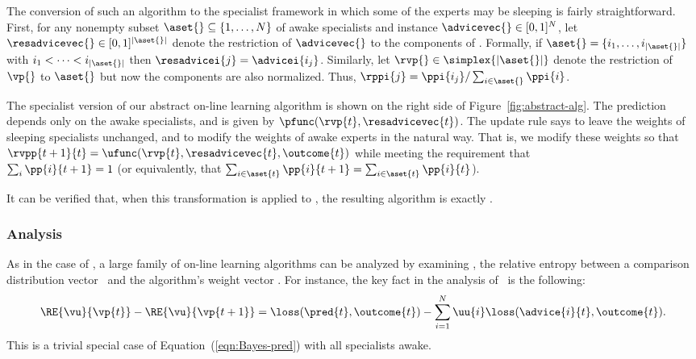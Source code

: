 The conversion of such an algorithm to the specialist framework in
which some of the experts may be sleeping is fairly straightforward.
First, for any nonempty subset 
$\aset{}\subseteq \{1,\ldots,N\}$ of awake
specialists and instance $\advicevec{}\in [0,1]^N$, let
$\resadvicevec{}\in [0,1]^{|\aset{}|}$ denote the restriction of
$\advicevec{}$ to the components of \aset{}.
Formally, if $\aset{} = \{i_1,\ldots,i_{|\aset{}|}\}$ with
$i_1<\cdots<i_{|\aset{}|}$
then
$\resadvicei{j} = \advicei{i_j}$.
Similarly, let $\rvp{}\in \simplex{|\aset{}|}$ denote the restriction of
$\vp{}$ to $\aset{}$ but now the components are also normalized.
Thus, $\rppi{j} = \ppi{i_j} / \sum_{i\in \aset{}} \ppi{i}$.

The specialist version of our abstract on-line learning algorithm is
shown on the right side of Figure~\ref{fig:abstract-alg}.
The prediction depends only on the awake specialists, and is given by
$\pfunc(\rvp{t},\resadvicevec{t})$.
The update rule says to leave the weights of sleeping specialists
unchanged, and to modify the weights of awake experts in the natural
way.
That is, we modify these weights so that
$\rvpp{t+1}{t} = \ufunc(\rvp{t},\resadvicevec{t},\outcome{t})$ while
meeting the requirement that \\
$\sum_i \pp{i}{t+1} = 1$
(or equivalently, that
$\sum_{i\in\aset{t}} \pp{i}{t+1} = 
  \sum_{i\in\aset{t}} \pp{i}{t}$).

It can be verified that, when this transformation is applied to
\Bayes, the resulting algorithm is exactly \SBayes.

\subsubsection*{Analysis}

As in the case of \Bayes, a large family of on-line learning
algorithms can be analyzed by examining , the relative
entropy between a comparison distribution vector \vu\ and the
algorithm's weight vector .
For instance, the key fact in the analysis of \Bayes\ is the
following:
\[
  \RE{\vu}{\vp{t}} - \RE{\vu}{\vp{t+1}}
    = \loss(\pred{t},\outcome{t})
       - \sum_{i=1}^N \uu{i} \loss(\advice{i}{t},\outcome{t}).
\]
This is a trivial special case of
Equation~(\ref{eqn:Bayes-pred}) with all specialists awake.

